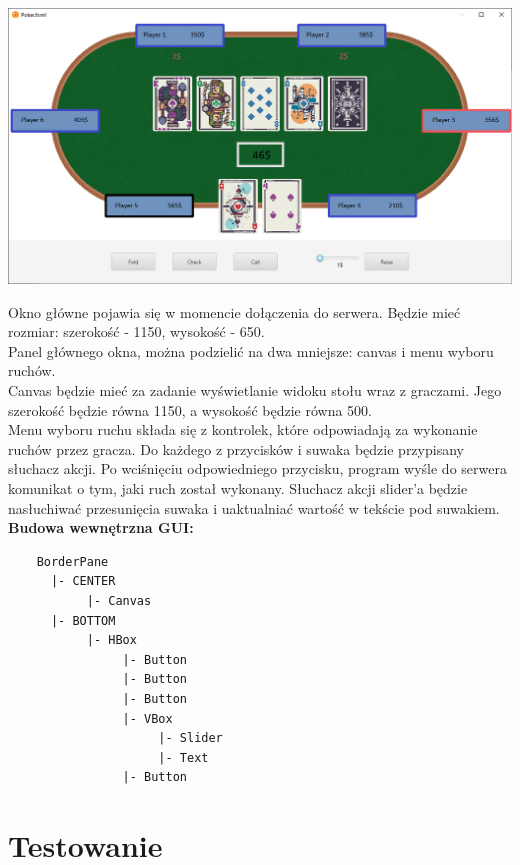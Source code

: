 \documentclass{article}
\begin{document}
            \begin{center}
                \includegraphics[width=\textwidth]{gui_table.png}
            \end{center}
        
            Okno główne pojawia się w momencie dołączenia do serwera.
            Będzie mieć rozmiar: szerokość - 1150, wysokość - 650.\\
            Panel głównego okna, można podzielić na dwa mniejsze: canvas i menu wyboru ruchów.\\
            Canvas będzie mieć za zadanie wyświetlanie widoku stołu wraz z graczami. Jego szerokość będzie równa 1150, a wysokość będzie równa 500.\\
            Menu wyboru ruchu składa się z kontrolek, które odpowiadają za wykonanie ruchów przez gracza.
            Do każdego z przycisków i suwaka będzie przypisany słuchacz akcji.
            Po wciśnięciu odpowiedniego przycisku, program wyśle do serwera komunikat o tym, jaki ruch został wykonany.
            Słuchacz akcji slider'a będzie nasłuchiwać przesunięcia suwaka i uaktualniać wartość w tekście pod suwakiem.
            \\
            \textbf{Budowa wewnętrzna GUI:}
            \begin{verbatim}
    BorderPane
      |- CENTER
           |- Canvas
      |- BOTTOM
           |- HBox
                |- Button
                |- Button
                |- Button
                |- VBox
                     |- Slider
                     |- Text
                |- Button
            \end{verbatim}
            

        
\section{Testowanie}
\end{document}
